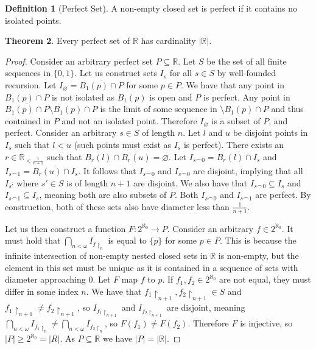 \documentclass{article}
\theoremstyle{definition}
\newtheorem{thm}{Theorem}[section]
\newtheorem{defn}[thm]{Definition}
\newcommand{\R}{\mathbb{R}}
\newcommand*{\mtset}{\ensuremath{\varnothing}}
\newcommand{\abs}[1]{\lvert#1\rvert}
\begin{document}
\newpage

\begin{defn}[Perfect Set]
    A non-empty closed set is perfect if it contains no isolated points.
\end{defn}

\begin{thm}
    Every perfect set of $\R$ has cardinality $\abs{\R}$.
\end{thm}

\begin{proof}
    Consider an arbitrary perfect set $P \subseteq \R$. Let $S$ be the set of all finite sequences in $\{0, 1\}$. Let us construct sets $I_s$ for all $s \in S$ by well-founded recursion. Let $I_\mtset = \overline{B_1(p) \cap P}$ for some $p \in P$. We have that any point in $B_1(p) \cap P$ is not isolated as $B_1(p)$ is open and $P$ is perfect. Any point in $\overline{B_1(p) \cap P}  \setminus B_1(p) \cap P$ is the limit of some sequence in $\setminus B_1(p) \cap P$ and thus contained in $P$ and not an isolated point. Therefore $I_\mtset$ is a subset of $P$, and perfect. Consider an arbitrary $s \in S$ of length $n$. Let $l$ and $u$ be disjoint points in $I_s$ such that $l < u$ (such points must exist as $I_s$ is perfect). There exists an $r \in \R_{< \frac{1}{n + 1}}$ such that $\overline{B_r(l)}  \cap \overline{B_r(u)} = \mtset$. Let $I_{s \frown 0} = \overline{B_r(l) \cap I_s}$ and $I_{s \frown 1} = \overline{B_r(u) \cap I_s}$. It follows that $I_{s \frown 0}$ and $I_{s \frown 0}$ are disjoint, implying that all $I_{s'}$ where $s' \in S$ is of length $n + 1$ are disjoint. We also have that $I_{s \frown 0} \subseteq I_s$ and $I_{s \frown 1} \subseteq I_{s}$, meaning both are also subsets of $P$. Both $I_{s \frown 0}$ and $I_{s \frown 1}$ are perfect. By construction, both of these sets also have diameter less than $\frac{1}{n + 1}$.

    Let us then construct a function $F: 2^{\aleph_0} \to P$. Consider an arbitrary $f \in 2^{\aleph_0}$. It must hold that $\bigcap_{n < \omega} I_{f\restriction_{n}}$ is equal to $\{p\}$ for some $p \in P$. This is because the infinite intersection of non-empty nested closed sets in $\R$ is non-empty, but the element in this set must be unique as it is contained in a sequence of sets with diameter approaching $0$. Let $F$ map $f$ to $p$. If $f_1, f_2 \in 2^{\aleph_0}$ are not equal, they must differ in some index $n$. We have that $f_1\restriction_{n + 1}, f_2\restriction_{n + 1} \in S$ and $f_1\restriction_{n + 1} \ne f_2\restriction_{n + 1}$, so $I_{f_1\restriction_{n + 1}}$ and $I_{f_2\restriction_{n + 1}}$ are disjoint, meaning $\bigcap_{n < \omega} I_{f_1\restriction_{n}} \ne \bigcap_{n < \omega} I_{f_2\restriction_{n}}$, so $F(f_1) \ne F(f_2)$. Therefore $F$ is injective, so $\abs{P} \ge 2^{\aleph_0} = \abs{R}$. As $P \subseteq \R$ we have $\abs{P} = \abs{\R}$.
\end{proof}
\end{document}
